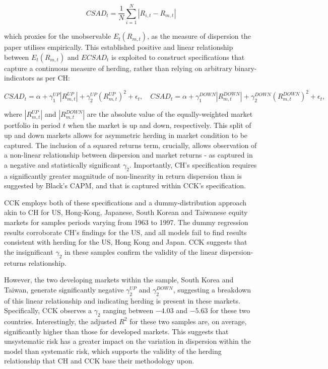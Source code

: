 \documentclass[12pt]{article}
\numberwithin{table}{section}   %
\begin{document}
$$
CSAD_t=\frac{1}{N}\sum^N_{i=1}|R_{i,t}-R_{m,t}|
$$

which proxies for the unobservable $E_t(R_{m,t})$, as the measure of dispersion the paper utilises empirically. This established positive and linear relationship between $E_t(R_{m,t})$ and $ECSAD_t$ is exploited to construct specifications that capture a continuous measure of herding, rather than relying on arbitrary binary-indicators as per CH:

$$
CSAD_t=\alpha+\gamma_1^{UP}|R_{m,t}^{UP}|+\gamma_2^{UP}(R_{m,t}^{UP})^2+\epsilon_t, \quad CSAD_t=\alpha+\gamma_1^{DOWN}|R_{m,t}^{DOWN}|+\gamma_2^{DOWN}(R_{m,t}^{DOWN})^2+\epsilon_t,
$$

where $|R_{m,t}^{UP}|$ and $|R_{m,t}^{DOWN}|$ are the absolute value of the equally-weighted market portfolio in period $t$ when the market is up and down, respectively. This split of up and down markets allows for asymmetric herding in market condition to be captured. The inclusion of a squared returns term, crucially, allows observation of a non-linear relationship between dispersion and market returns - as captured in a negative and statistically significant $\gamma_2$. Importantly, CH’s specification requires a significantly greater magnitude of non-linearity in return dispersion than is suggested by Black’s CAPM, and that is captured within CCK’s specification.

CCK employs both of these specifications and a dummy-distribution approach akin to CH for US, Hong-Kong, Japanese, South Korean and Taiwanese equity markets for samples periods varying from 1963 to 1997. The dummy regression results corroborate CH’s findings for the US, and all models fail to find results consistent with herding for the US, Hong Kong and Japan. CCK suggests that the insignificant $\gamma_2$ in these samples confirm the validity of the linear dispersion-returns relationship. 

However, the two developing markets within the sample, South Korea and Taiwan, generate significantly negative $\gamma_2^{UP}$ and $\gamma_2^{DOWN}$, suggesting a breakdown of this linear relationship and indicating herding is present in these markets. Specifically, CCK observes a $\gamma_2$ ranging between $-4.03$ and $-5.63$ for these two countries. Interestingly, the adjusted $R^2$ for these two samples are, on average, significantly higher than those for developed markets. This suggests that unsystematic risk has a greater impact on the variation in dispersion within the model than systematic risk, which supports the validity of the herding relationship that CH and CCK base their methodology upon.
\end{document}
